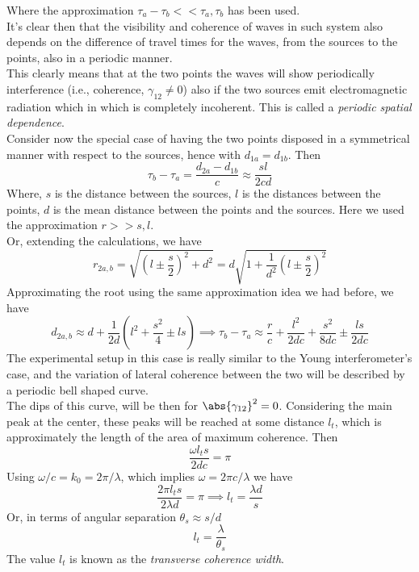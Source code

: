 \documentclass[../electromagnetism.tex]{subfiles}
\begin{document}
Where the approximation $\tau_a-\tau_b<<\tau_a,\tau_b$ has been used.\\
It's clear then that the visibility and coherence of waves in such system also depends on the difference of travel times for the waves, from the sources to the points, also in a periodic manner.\\
This clearly means that at the two points the waves will show periodically interference (i.e., coherence, $\gamma_{12}\ne0$) also if the two sources emit electromagnetic radiation which in which is completely incoherent. This is called a \textit{periodic spatial dependence}.\\
Consider now the special case of having the two points disposed in a symmetrical manner with respect to the sources, hence with $d_{1a}=d_{1b}$. Then
\begin{equation}
	\tau_{b}-\tau_a=\frac{d_{2a}-d_{1b}}{c}\approx\frac{sl}{2cd}
	\label{eq:taudiffapproxspch}
\end{equation}
Where, $s$ is the distance between the sources, $l$ is the distances between the points, $d$ is the mean distance between the points and the sources. Here we used the approximation $r>>s,l$.\\
Or, extending the calculations, we have
\begin{equation*}
	r_{2a,b}=\sqrt{\left( l\pm\frac{s}{2} \right)^2+d^2}=d\sqrt{1+\frac{1}{d^2}\left( l\pm\frac{s}{2} \right)^2}
\end{equation*}
Approximating the root using the same approximation idea we had before, we have
\begin{equation*}
	d_{2a,b}\approx d+\frac{1}{2d}\left( l^2+\frac{s^2}{4}\pm ls \right)\implies\tau_b-\tau_a\approx\frac{r}{c}+\frac{l^2}{2dc}+\frac{s^2}{8dc}\pm\frac{ls}{2dc}
\end{equation*}
The experimental setup in this case is really similar to the Young interferometer's case, and the variation of lateral coherence between the two will be described by a periodic bell shaped curve.\\
The dips of this curve, will be then for $\abs{\gamma_{12}}^2=0$. Considering the main peak at the center, these peaks will be reached at some distance $l_t$, which is approximately the length of the area of maximum coherence. Then
\begin{equation*}
	\frac{\omega l_ts}{2dc}=\pi
\end{equation*}
Using $\omega/c=k_0=2\pi/\lambda$, which implies $\omega=2\pi c/\lambda$ we have
\begin{equation}
	\frac{2\pi l_ts}{2\lambda d}=\pi\implies l_t=\frac{\lambda d}{s}
	\label{eq:transversecoherencewidth}
\end{equation}
Or, in terms of angular separation $\theta_s\approx s/d$
\begin{equation}
	l_t=\frac{\lambda}{\theta_s}
	\label{eq:tcw2}
\end{equation}
The value $l_t$ is known as the \emph{transverse coherence width}.
\end{document}

